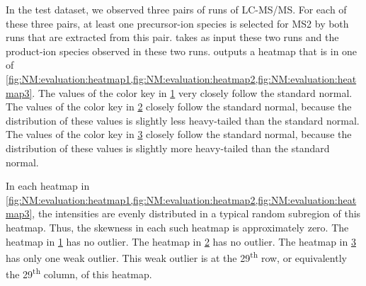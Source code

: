 \begin{figure}
\caption[A heatmap generated by \cref{alg:NM:methods:evaluateNormality}.]{
\captext{}\label{fig:NM:evaluation:heatmap1}}
\end{figure}
\begin{figure}
\caption[A heatmap generated by \cref{alg:NM:methods:evaluateNormality}.]{
\captext{}\label{fig:NM:evaluation:heatmap2}}
\end{figure}
\begin{figure}
\caption[A heatmap generated by \cref{alg:NM:methods:evaluateNormality}.]{
\captext{}\label{fig:NM:evaluation:heatmap3}}
\end{figure}

In the test dataset, we observed three pairs of runs of \gls{LC-MS/MS}.
For each of these three pairs, at least one precursor-ion species is selected for \gls{MS2} by both runs that are extracted from this pair.
 takes as input these two runs and the product-ion species observed in these two runs. 
 outputs a heatmap that is in one of
	\cref{fig:NM:evaluation:heatmap1,fig:NM:evaluation:heatmap2,fig:NM:evaluation:heatmap3}.
The values of the color key in \cref{fig:NM:evaluation:heatmap1} very closely follow the standard normal.
The values of the color key in \cref{fig:NM:evaluation:heatmap2} closely      follow the standard normal,
	because the distribution of these values is slightly less heavy-tailed than the standard normal.
The values of the color key in \cref{fig:NM:evaluation:heatmap3} closely      follow the standard normal,
	because the distribution of these values is slightly more heavy-tailed than the standard normal.

In each heatmap in \cref{fig:NM:evaluation:heatmap1,fig:NM:evaluation:heatmap2,fig:NM:evaluation:heatmap3},
	the intensities are evenly distributed in a typical random subregion of this heatmap.
Thus, the skewness in each such heatmap is approximately zero.
The heatmap in \cref{fig:NM:evaluation:heatmap1} has no outlier.
The heatmap in \cref{fig:NM:evaluation:heatmap2} has no outlier.
The heatmap in \cref{fig:NM:evaluation:heatmap3} has only one weak outlier.
This weak outlier is at the 29\textsuperscript{th} row, or equivalently the 29\textsuperscript{th} column, of this heatmap. 
	
